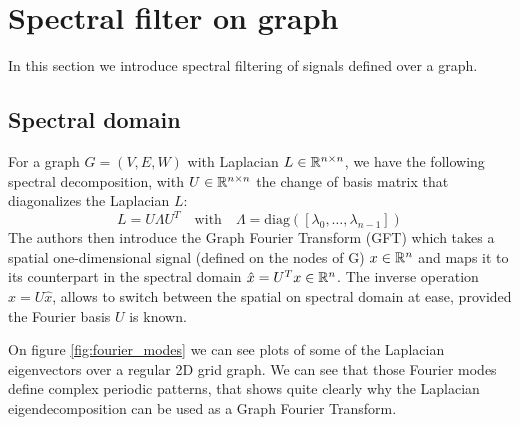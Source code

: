 \section{Spectral filter on graph}

In this section we introduce spectral filtering of signals defined over a graph. 

\subsection{Spectral domain}

For a graph $G = (V, E, W)$ with Laplacian $L \in \mathbb{R}^{n\times n}$, we have the following spectral decomposition, with $U \in \mathbb{R}^{n\times n}$ the change of basis matrix that diagonalizes the Laplacian $L$:
%
\begin{equation}
    L = U \Lambda U^T \quad \mathrm{with} \quad \Lambda = \mathrm{diag}([\lambda_0, \dots, \lambda_{n-1}])
\end{equation}
%
The authors then introduce the Graph Fourier Transform (GFT) which takes a spatial one-dimensional signal (defined on the nodes of G) $x \in \mathbb{R}^n$ and maps it to its counterpart in the spectral domain $\hat x = U^T x \in \mathbb{R}^n$. The inverse operation $x = U \hat x$, allows to switch between the spatial on spectral domain at ease, provided the Fourier basis $U$ is known.

On figure \ref{fig:fourier_modes} we can see plots of some of the Laplacian eigenvectors over a regular 2D grid graph. We can see that those Fourier modes define complex periodic patterns, that shows quite clearly why the Laplacian eigendecomposition can be used as a Graph Fourier Transform.

